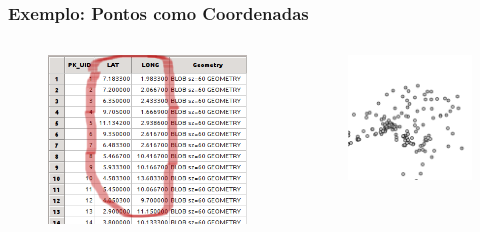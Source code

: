 \documentclass[hyperref={pdfpagelabels=true}]{beamer}
\begin{document}
\begin{frame}
\frametitle{Exemplo: Pontos como Coordenadas}


\begin{columns}
  \begin{column}{5cm}
    \begin{figure}
    \includegraphics[scale=0.4]{geometry3.png}
    \end{figure}
  \end{column}
  \begin{column}{5cm}
    \begin{figure}
    \includegraphics[scale=0.33]{geometry.png}
    \end{figure}
  \end{column}  
\end{columns}

\end{frame}
\end{document}
